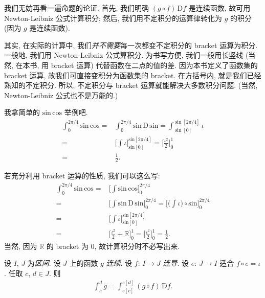 我们无妨再看一遍命题的论证. 首先, 我们明确 $(g \circ f)\,\mathrm{D}f$ 是连续函数, 故可用 Newton-Leibniz 公式计算积分; 然后, 我们用不定积分的运算律转化为 $g$ 的积分 (因为 $g$ 是连续函数).

其实, 在实际的计算中, 我们\emph{并不需要}每一次都变不定积分的 bracket 运算为积分. 一般地, 我们用 Newton-Leibniz 公式算积分. 为书写方便, 我们一般用长竖线 (当然, 在本书, 用 bracket 运算) 代替函数在二点的值的差. 因为本书定义了函数集的 bracket 运算, 故我们可直接变积分为函数集的 bracket. 在方括号内, 就是我们已经熟知的不定积分. 所以, 不定积分与 bracket 运算就能解决大多数积分问题. (当然, Newton-Leibniz 公式也不是万能的.)

\begin{example}
    我拿简单的 $\mathrm{sin}\, \mathrm{cos}$ 举例吧.
    \begin{align*}
        \int_{0}^{2\pi/4} {\mathrm{sin}\,\mathrm{cos}}
        = {} & \int_{0}^{2\pi/4} {\mathrm{sin}\,\mathrm{D}\,\mathrm{sin}}
        = \int_{\sin[0]}^{\sin[2\pi/4]} {\iota}                                    \\
        = {} & \Bigg[ \int {\iota} \Bigg]_{\mathrm{sin}[0]}^{\mathrm{sin}[2\pi/4]}
        = \Bigg[ \frac{\iota^2}{2} \Bigg]_{0}^{1}                                  \\
        = {} & \frac{1}{2}.
    \end{align*}

    若充分利用 bracket 运算的性质, 我们可以这么写:
    \begin{align*}
        \int_{0}^{2\pi/4} {\mathrm{sin}\,\mathrm{cos}}
        = {} & \Bigg[ \int {\mathrm{sin}\,\mathrm{cos}} \Bigg]_{0}^{2\pi/4}             \\
        = {} & \Bigg[ \int {\mathrm{sin}\,\mathrm{D}\,\mathrm{sin}} \Bigg]_{0}^{2\pi/4}
        = \Bigg[ \Bigg( \int {\iota} \Bigg) \circ \mathrm{sin} \Bigg]_{0}^{2\pi/4}      \\
        = {} & \Bigg[ \int {\iota} \Bigg]_{\mathrm{sin}[0]}^{\mathrm{sin}[2\pi/4]}      \\
        = {} & \Bigg[ \frac{\iota^2}{2} + \mathbb{R} \Bigg]_{0}^{1}
        = \Bigg[ \frac{\iota^2}{2} \Bigg]_{0}^{1}
        = \frac{1}{2}.
    \end{align*}
    当然, 因为 $\mathbb{R}$ 的 bracket 为 $0$, 故计算积分时不必写出来.
\end{example}

\begin{theorem}
    设 $I$, $J$ 为\emph{区间}. 设 $J$ 上的函数 $g$ \emph{连续}. 设 $f$: $I \to J$ \emph{连导}. 设 $e$: $J \to I$ 适合 $f \circ e = \iota$. 任取 $c$, $d \in J$. 则
    \begin{align*}
        \int_{c}^{d} {g} = \int_{e[c]}^{e[d]} {(g \circ f)\,\mathrm{D}f}.
    \end{align*}
\end{theorem}

